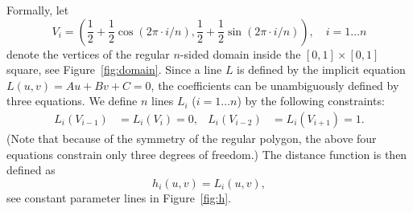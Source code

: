 \documentclass[9pt,academicons]{article}
\begin{document}
Formally, let
\begin{equation}
  V_i=\left(\frac{1}{2}+\frac{1}{2}\cos(2\pi\cdot i/n),
            \frac{1}{2}+\frac{1}{2}\sin(2\pi\cdot i/n)\right),\quad i=1\dots n
\end{equation}
denote the vertices of the regular $n$-sided domain inside the $[0,1]\times[0,1]$ square,
see Figure~\ref{fig:domain}. %
Since a line $L$ is defined by the implicit equation $L(u,v)=Au+Bv+C=0$, the coefficients can
be unambiguously defined by three equations. We define $n$ lines
$L_i$ ($i=1\dots n$) by the following constraints:
\begin{align}
  L_i(V_{i-1})&=L_i(V_i)=0, & L_i(V_{i-2})&=L_i(V_{i+1})=1.
\end{align}
(Note that because of the symmetry of the regular polygon, the above four equations constrain
only three degrees of freedom.) The distance function is then defined as
\begin{equation}
  h_i(u,v)=L_i(u,v),
\end{equation}
see constant parameter lines in Figure~\ref{fig:h}.
\end{document}

